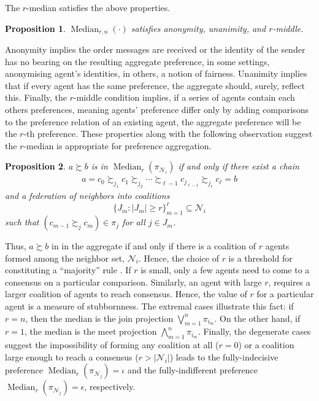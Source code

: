 \documentclass[conference]{ieeeconf}
\newcommand{\N}{\mathcal{N}}
\newcommand{\prefers}{\succsim}
\newcommand{\bigjoin}{\bigvee}
\newcommand{\bigmeet}{\bigwedge}
\renewcommand{\geq}{\geqslant}
\DeclareMathOperator{\Median}{Median}
\newtheorem{proposition}{Proposition}
\begin{document}
\noindent The $r$-median satisfies the above properties.

\begin{proposition}
    $\Median_{r,n}(\cdot)$ satisfies anonymity, unanimity, and $r$-middle.
\end{proposition}

Anonymity implies the order messages are received or the identity of the sender has no bearing on the resulting aggregate preference, in some settings, anonymising agent's identities, in others, a notion of fairness. Unanimity implies that if every agent has the same preference, the aggregate should, surely, reflect this. Finally, the $r$-middle condition implies, if a series of agents contain each others preferences, meaning agents' preference differ only by adding comparisons to the preference relation of an existing agent, the aggregate preference will be the $r$-th preference. These properties along with the following observation suggest the $r$-median is appropriate for preference aggregation.

\begin{proposition}
    $a \prefers b$ is in $\Median_r(\pi_{\N_i})$ if and only if there exist a chain
    \begin{align*}
        a = c_0 \prefers_{j_1} c_1 \prefers_{j_2} \cdots \prefers_{\ell-1} c_{j_{\ell-1}} \prefers_{j_\ell} c_{\ell} = b
    \end{align*}
    and a federation of neighbors into coalitions \[\{ J_m : |J_m| \geq r \}_{m=1}^{\ell} \subseteq \N_i\] such that $(c_{m-1} \prefers_{j} c_{m}) \in \pi_j$ for all  $j \in J_m$.
\end{proposition}

Thus, $a \prefers b$ in in the aggregate if and only if there is a coalition of $r$ agents formed among the neighbor set, $\N_i$. Hence, the choice of $r$ is a threshold for constituting a ``majority'' rule \cite{buchanan1965calculus}. If $r$ is small, only a few agents need to come to a consensus on a particular comparison. Similarly, an agent with large $r$, requires a larger coalition of agents to reach consensus. Hence, the value of $r$ for a particular agent is a measure of stubbornness. The extremal cases illustrate this fact: if $r= n$, then the median is the join projection $\bigjoin_{m=1}^n \pi_{i_m}$. On the other hand, if $r=1$, the median is the meet projection $\bigmeet_{m=1}^n \pi_{i_m}$. Finally, the degenerate cases suggest the impossibility of forming any coalition at all ($r=0$) or a coalition large enough to reach a consensus ($r > |\N_i|$) leads to the fully-indecisive preference $\Median_r(\pi_{\N_j}) = \iota$ and the fully-indifferent preference $\Median_r(\pi_{\N_j}) = \epsilon$, respectively.
\end{document}
